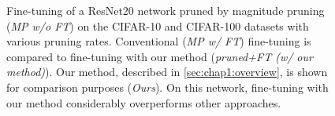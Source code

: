 \begin{figure}
  \centering
  \caption{ Fine-tuning of a ResNet20 network pruned by magnitude pruning
    (\emph{MP w/o FT}) on the CIFAR-10 and CIFAR-100 datasets with various pruning
    rates. Conventional (\emph{MP w/ FT}) fine-tuning is compared to fine-tuning
    with our method (\emph{pruned+FT (w/ our method)}). Our method, described in
    \cref{sec:chap1:overview}, is shown for comparison purposes (\emph{Ours}). On
    this network, fine-tuning with our method considerably overperforms other
    approaches.}
  \label{fig:chap1:finetuning_impact_resnet20}
\end{figure}


